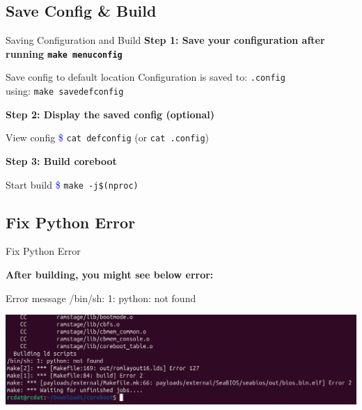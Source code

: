 \documentclass{beamer}
\begin{document}
	\subsection{Save Config \& Build}
	\begin{frame}{Saving Configuration and Build}
		\textbf{Step 1: Save your configuration after running \texttt{make menuconfig}}
		
		\begin{exampleblock}{Save config to default location}
			Configuration is saved to: \texttt{.config} \\ using: \texttt{make savedefconfig}
		\end{exampleblock}
		
		\textbf{Step 2: Display the saved config (optional)}
		
		\begin{exampleblock}{View config}
			\textcolor{blue}{\$} \texttt{cat defconfig} (or \texttt{cat .config})
		\end{exampleblock}
		
		\textbf{Step 3: Build coreboot}
		
		\begin{exampleblock}{Start build}
			\textcolor{blue}{\$} \texttt{make -j\$(nproc)}
		\end{exampleblock}
	\end{frame}
	
	
	
	
	
	\subsection{Fix Python Error}
	\begin{frame}{Fix Python Error}
		
		\textbf{After building, you might see below error:}
		
		\begin{exampleblock}{Error message}
			/bin/sh: 1: python: not found
		\end{exampleblock}
		
		\centering
		\includegraphics[width=1\linewidth]{images/img5}
	\end{frame}
	
\end{document}
